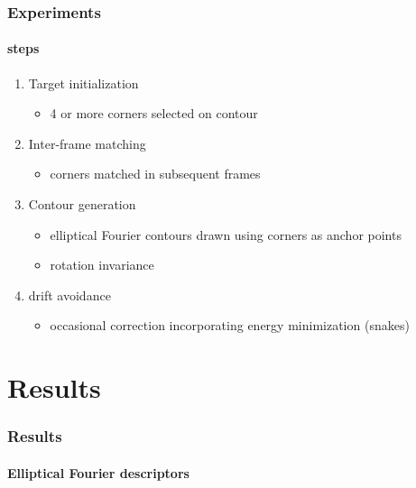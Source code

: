 \begin{frame}
\frametitle{Experiments}
\framesubtitle{steps}
\logoCSIPCPL\mypagenum
		\begin{enumerate}
		\item {\color{red}Target initialization}
			\begin{itemize}
				\item 4 or more corners selected on contour
			\end{itemize}
		\item {\color{red}Inter-frame matching}
			\begin{itemize}
				\item corners matched in subsequent frames
			\end{itemize}
		\item {\color{red}Contour generation}
			\begin{itemize}
				\item elliptical Fourier contours drawn using corners as anchor points 
				\item rotation invariance
			\end{itemize}
		\item {\color{red}drift avoidance}
			\begin{itemize}
				\item occasional correction incorporating energy minimization (snakes)
			\end{itemize}
	\end{enumerate}
\end{frame}



\section{Results}
\begin{frame}[plain]
\frametitle{Results}
\framesubtitle{Elliptical Fourier descriptors}
\mypagenum
	\begin{changemargin}{-1.3in}{0in}
	\end{changemargin}
\end{frame}





